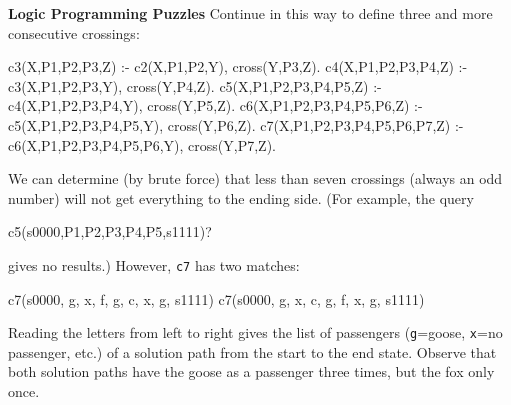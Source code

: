 \begin{minipage}[t]{\sw}
\slidenumber
\LARGE
{\bf Logic Programming Puzzles}\exx
Continue in this way to define three and more consecutive crossings:
{\Large
\begin{qv}
c3(X,P1,P2,P3,Z) :- c2(X,P1,P2,Y), cross(Y,P3,Z).
c4(X,P1,P2,P3,P4,Z) :- c3(X,P1,P2,P3,Y), cross(Y,P4,Z).
c5(X,P1,P2,P3,P4,P5,Z) :- c4(X,P1,P2,P3,P4,Y), cross(Y,P5,Z).
c6(X,P1,P2,P3,P4,P5,P6,Z) :- c5(X,P1,P2,P3,P4,P5,Y), cross(Y,P6,Z).
c7(X,P1,P2,P3,P4,P5,P6,P7,Z) :- c6(X,P1,P2,P3,P4,P5,P6,Y),
                                cross(Y,P7,Z).
\end{qv}
}
We can determine (by brute force)
that less than seven crossings (always an odd number)
will not get everything to the ending side.
(For example, the query
\begin{qv}
c5(s0000,P1,P2,P3,P4,P5,s1111)?
\end{qv}
gives no results.)
However, \verb'c7' has two matches:
\begin{qv}
c7(s0000, g, x, f, g, c, x, g, s1111)
c7(s0000, g, x, c, g, f, x, g, s1111)
\end{qv}
Reading the letters from left to right
gives the list of passengers (\verb'g'=goose, \verb'x'=no passenger, etc.)
of a solution path from the start to the end state.\exx
Observe that both solution paths have the goose as a passenger three times,
but the fox only once.
\end{minipage}
